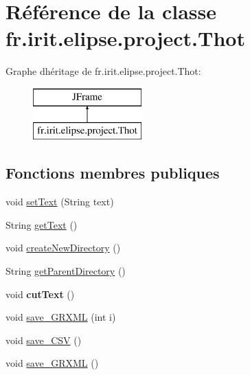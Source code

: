 \hypertarget{classfr_1_1irit_1_1elipse_1_1project_1_1_thot}{}\section{Référence de la classe fr.\+irit.\+elipse.\+project.\+Thot}
\label{classfr_1_1irit_1_1elipse_1_1project_1_1_thot}
Graphe d\textquotesingle{}héritage de fr.\+irit.\+elipse.\+project.\+Thot\+:\begin{figure}[H]
\begin{center}
\leavevmode
\includegraphics[height=2.000000cm]{classfr_1_1irit_1_1elipse_1_1project_1_1_thot}
\end{center}
\end{figure}
\subsection*{Fonctions membres publiques}
\begin{DoxyCompactItemize}
\item 
void \mbox{\hyperlink{classfr_1_1irit_1_1elipse_1_1project_1_1_thot_a4b23a42489aee4837e08348f288c4616}{set\+Text}} (String text)
\item 
String \mbox{\hyperlink{classfr_1_1irit_1_1elipse_1_1project_1_1_thot_acf8da72f08d81ea480817bbec8de3083}{get\+Text}} ()
\item 
void \mbox{\hyperlink{classfr_1_1irit_1_1elipse_1_1project_1_1_thot_a971476b3bfa84ebbde12c591ab7c2763}{create\+New\+Directory}} ()
\item 
String \mbox{\hyperlink{classfr_1_1irit_1_1elipse_1_1project_1_1_thot_a31a0a5cb4843fb911fa998b1bb4998e7}{get\+Parent\+Directory}} ()
\item 
\mbox{\label{classfr_1_1irit_1_1elipse_1_1project_1_1_thot_a19f1f0d4c22e9abdcf6a0da71bc4674b}} 
void {\bfseries cut\+Text} ()
\item 
void \mbox{\hyperlink{classfr_1_1irit_1_1elipse_1_1project_1_1_thot_a0434fbedf5ed08fba68adb12bb8bb72e}{save\+\_\+\+G\+R\+X\+ML}} (int i)
\item 
void \mbox{\hyperlink{classfr_1_1irit_1_1elipse_1_1project_1_1_thot_ac49a3db580727813ecd301c504737b2d}{save\+\_\+\+C\+SV}} ()
\item 
void \mbox{\hyperlink{classfr_1_1irit_1_1elipse_1_1project_1_1_thot_a40e71ed10b6e96a8ef9c4ad3b1b40efa}{save\+\_\+\+G\+R\+X\+ML}} ()
\end{DoxyCompactItemize}
